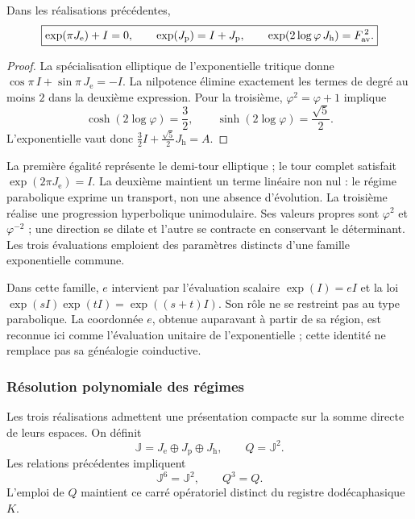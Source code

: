 \begin{proposition}
\label{x_reciprocidad:euler-trit-evaluaciones}
Dans les réalisations précédentes,
\begin{equation}
 \boxed{
 \exp(\pi J_{\mathrm e})+I=0,\qquad
 \exp(J_{\mathrm p})=I+J_{\mathrm p},\qquad
 \exp(2\log\varphi\,J_{\mathrm h})=F_{\rm av}^{\,2}.}
 \label{x_reciprocidad:euler-trit-tres-evaluaciones}
\end{equation}
\end{proposition}
\begin{proof}
La spécialisation elliptique de l’exponentielle tritique donne
\(\cos\pi\,I+\sin\pi\,J_{\mathrm e}=-I\).
La nilpotence élimine exactement les termes de degré au moins \(2\)
dans la deuxième expression. Pour la troisième, \(\varphi^2=\varphi+1\) implique
\[
 \cosh(2\log\varphi)=\frac32,\qquad
 \sinh(2\log\varphi)=\frac{\sqrt5}{2}.
\]
L’exponentielle vaut donc
\(\frac32I+\frac{\sqrt5}{2}J_{\mathrm h}=A\).
\end{proof}

La première égalité représente le demi-tour elliptique ; le tour complet
satisfait \(\exp(2\pi J_{\mathrm e})=I\). La deuxième maintient un terme
linéaire non nul : le régime parabolique exprime un transport, non une absence
d’évolution. La troisième réalise une progression hyperbolique unimodulaire. Ses
valeurs propres sont \(\varphi^2\) et \(\varphi^{-2}\) ; une direction se dilate et
l’autre se contracte en conservant le déterminant. Les trois évaluations
emploient des paramètres distincts d’une famille exponentielle commune.

Dans cette famille, \(e\) intervient par l’évaluation scalaire
\(\exp(I)=eI\) et la loi \(\exp(sI)\exp(tI)=\exp((s+t)I)\).
Son rôle ne se restreint pas au type parabolique. La coordonnée \(e\), obtenue
auparavant à partir de sa région, est reconnue ici comme l’évaluation unitaire
de l’exponentielle ; cette identité ne remplace pas sa généalogie coinductive.

\subsubsection{Résolution polynomiale des régimes}

Les trois réalisations admettent une présentation compacte sur la somme
directe de leurs espaces. On définit
\[
 \mathbb J=J_{\mathrm e}\oplus J_{\mathrm p}\oplus J_{\mathrm h},
 \qquad Q=\mathbb J^2.
\]
Les relations précédentes impliquent
\[
 \mathbb J^6=\mathbb J^2,\qquad Q^3=Q.
\]
L’emploi de \(Q\) maintient ce carré opératoriel distinct du registre
dodécaphasique \(K\).

